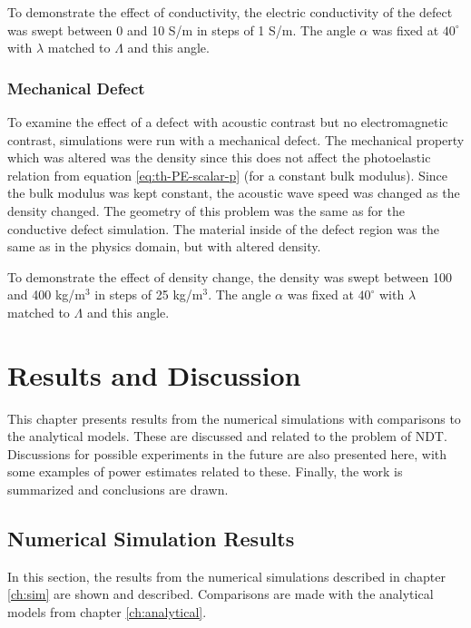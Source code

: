 \documentclass[11pt,twoside]{eitExjobb}
\begin{document}
	To demonstrate the effect of conductivity, the electric conductivity of the defect was swept between 0 and 10 S/m in steps of 1 S/m. The angle $\alpha$ was fixed at $40^\circ$ with $\lambda$ matched to $\Lambda$ and this angle.
	
	\subsection{Mechanical Defect}
	To examine the effect of a defect with acoustic contrast but no electromagnetic contrast, simulations were run with a mechanical defect. The mechanical property which was altered was the density since this does not affect the photoelastic relation from equation \eqref{eq:th-PE-scalar-p} (for a constant bulk modulus). Since the bulk modulus was kept constant, the acoustic wave speed was changed as the density changed. The geometry of this problem was the same as for the conductive defect simulation. The material inside of the defect region was the same as in the physics domain, but with altered density.
	
	To demonstrate the effect of density change, the density was swept between 100 and 400 kg/m$^3$ in steps of 25 kg/m$^3$. The angle $\alpha$ was fixed at $40^\circ$ with $\lambda$ matched to $\Lambda$ and this angle.
	
	\chapter{Results and Discussion} \label{ch:res-disc}
	This chapter presents results from the numerical simulations with comparisons to the analytical models. These are discussed  and related to the problem of NDT. Discussions for possible experiments in the future are also presented here, with some examples of power estimates related to these. Finally, the work is summarized and conclusions are drawn.
	
	\section{Numerical Simulation Results}
	In this section, the results from the numerical simulations described in chapter \ref{ch:sim} are shown and described. Comparisons are made with the analytical models from chapter \ref{ch:analytical}.
	
\end{document}
